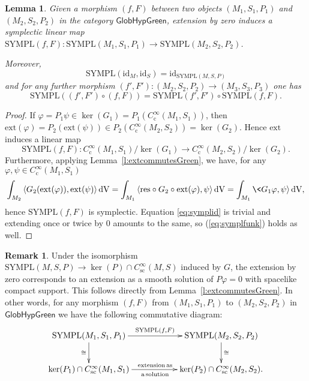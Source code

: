 \documentclass[a4paper,11pt]{amsart}
\newtheorem{lemma}[thm]{Lemma}
\theoremstyle{definition}
\newtheorem{rem}[thm]{Remark}
\begin{document}
\begin{lemma}\label{l:symplfunctor}
Given a morphism $(f,F)$ between two objects $(M_1,S_1,P_1)$ and $(M_2,S_2,P_2)$ in the category ${\mathsf{GlobHypGreen}}$, extension by zero induces a symplectic linear map ${\mathrm{SYMPL}}(f,F):{\mathrm{SYMPL}}(M_1,S_1,P_1)\rightarrow {\mathrm{SYMPL}}(M_2,S_2,P_2)$.

Moreover, 
\begin{equation}
{\mathrm{SYMPL}}({\mathrm{id}}_M,{\mathrm{id}}_S)={\mathrm{id}}_{{\mathrm{SYMPL}}(M,S,P)}
\label{eq:symplid} 
\end{equation}
and for any further morphism $(f',F'):(M_2,S_2,P_2)\rightarrow(M_3,S_3,P_3)$ one has
\begin{equation}
{\mathrm{SYMPL}}((f',F')\circ(f,F))={\mathrm{SYMPL}}(f',F')\circ{\mathrm{SYMPL}}(f,F).
\label{eq:symplfunk}
\end{equation}
\end{lemma}

\begin{proof}
If ${\varphi}=P_1\psi\in\ker(G_1)=P_1({C^\infty_\mathrm{c}}(M_1,S_1))$, then ${\mathrm{ext}}({\varphi})=P_2({\mathrm{ext}}(\psi))\in P_2({C^\infty_\mathrm{c}}(M_2,S_2))=\ker(G_2)$.
Hence ${\mathrm{ext}}$ induces a linear map 
$$
{\mathrm{SYMPL}}(f,F):{C^\infty_\mathrm{c}}(M_1,S_1)/\ker(G_1)\to {C^\infty_\mathrm{c}}(M_2,S_2)/\ker(G_2).
$$
Furthermore, applying Lemma~\ref{l:extcommutesGreen}, we have, for any ${\varphi},\psi\in{C^\infty_\mathrm{c}}(M_1,S_1)$
$$
\int_{M_2}{\langle} G_2({\mathrm{ext}}({\varphi})),{\mathrm{ext}}(\psi){\rangle} {\,\mathrm{dV}}
=
\int_{M_1}{\langle}{\mathrm{res}}\circ G_2\circ{\mathrm{ext}}({\varphi}),\psi{\rangle} {\,\mathrm{dV}}
=
\int_{M_1}\<G_1{\varphi},\psi{\rangle} {\,\mathrm{dV}},
$$ 
hence ${\mathrm{SYMPL}}(f,F)$ is symplectic.
Equation \eqref{eq:symplid} is trivial and extending once or twice by $0$ amounts to the same, so (\ref{eq:symplfunk}) holds as well.
\end{proof}

\begin{rem}\label{rem:symplanders}
Under the isomorphism ${\mathrm{SYMPL}}(M,S,P) \to \ker(P) \cap {C^\infty_\mathrm{sc}}(M,S)$ induced by $G$, the extension by zero corresponds to an extension as a smooth solution of $P{\varphi}=0$ with spacelike compact support.
This follows directly from Lemma~\ref{l:extcommutesGreen}.
In other words, for any morphism $(f,F)$ from $(M_1,S_1,P_1)$ to $(M_2,S_2,P_2)$ in ${\mathsf{GlobHypGreen}}$ we have the following commutative diagram:
$$
\xymatrix{
{\mathrm{SYMPL}}(M_1,S_1,P_1) \ar[rr]^{{\mathrm{SYMPL}}(f,F)} \ar[d]_\cong
&&  
{\mathrm{SYMPL}}(M_2,S_2,P_2) \ar[d]^\cong\\
\ker(P_1)\cap {C^\infty_\mathrm{sc}}(M_1,S_1)  \ar[rr]^{\mathrm{extension\, as}}_{\mathrm{a\, solution}}
&&  
\ker(P_2)\cap {C^\infty_\mathrm{sc}}(M_2,S_2) .
}
$$
\end{rem}
\end{document}
